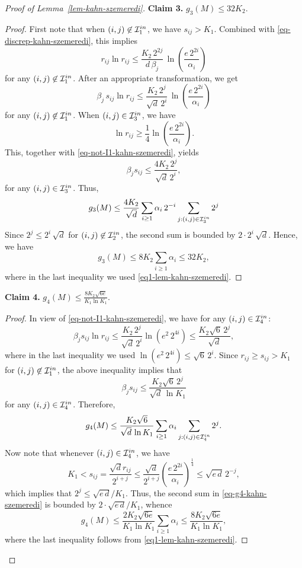 \documentclass[12pt]{article}
\theoremstyle{definition}
\theoremstyle{plain}
\def\InI{{\cal{I}}^{in}}
\begin{document}
\begin{proof}[Proof of Lemma~\ref{lem-kahn-szemeredi}]
\medskip

\noindent\textbf{Claim 3.} $g_3(M)\leq 32K_2$.
\begin{proof}
First note that when $(i,j)\not\in \InI_1$, we have $s_{ij}> K_1$.  Combined with \eqref{eq-discrep-kahn-szemeredi}, this implies 
$$
r_{ij}\ln r_{ij}\leq \frac{K_2\, 2^{2j}}{d\, \beta_j}\, \ln\left(\frac{e\, 2^{2i}}{\alpha_i}\right)
$$
for any  $(i,j)\not\in \InI_1$. After an appropriate transformation, we get
\begin{equation}\label{eq-not-I1-kahn-szemeredi}
\beta_j\, s_{ij}\ln r_{ij}\leq \frac{K_2\, 2^{j}}{\sqrt{d}\, 2^{i}}\, \ln\left(\frac{e\, 2^{2i}}{\alpha_i}\right)
\end{equation} 
for any  $(i,j)\not\in \InI_1$. When $(i,j)\in \InI_3$, we have
$$
\ln r_{ij}\geq \frac{1}{4}\ln\left(\frac{e\, 2^{2i}}{\alpha_i}\right).
$$
This, together with \eqref{eq-not-I1-kahn-szemeredi}, yields
$$
\beta_j s_{ij}\leq \frac{4K_2\, 2^{j}}{\sqrt{d}\, 2^i},
$$
for any  $(i,j)\in \InI_3$. 
Thus,
$$
g_3(M)\leq \frac{4K_2}{\sqrt{d}}\sum_{i\geq 1}\alpha_i\, 2^{-i} \sum_{j:(i,j)\in\InI_3} 2^j
$$
Since $2^{j}\leq 2^i\, \sqrt{d}$ for $(i,j)\not\in \InI_2$,
the second sum is bounded by $2\cdot 2^i\, \sqrt{d}$. Hence, we have
$$
g_3(M)\leq 8K_2\sum_{i\geq 1}\alpha_i\leq 32K_2,
$$
where in the last inequality we used \eqref{eq1-lem-kahn-szemeredi}.
\end{proof}


\medskip

\noindent\textbf{Claim 4.} $g_4(M)\leq \frac{8K_2\sqrt{6e}}{K_1 \ln K_1}$.
\begin{proof}
In view of \eqref{eq-not-I1-kahn-szemeredi}, we have for any $(i,j)\in \InI_4$: 
$$
\beta_j s_{ij}\ln r_{ij}\leq 
\frac{K_2\, 2^j}{\sqrt{d}\, 2^i}\ln( e^2\, 2^{4i})
\leq \frac{K_2\sqrt{6}\, 2^j}{\sqrt{d}},
$$
where in the last inequality we used $\ln( e^2\, 2^{4i})\leq \sqrt{6}\, 2^i$.
Since $r_{ij}\geq s_{ij}> K_1$ for $(i,j)\not\in \InI_1$, the above inequality implies that 
$$
\beta_j s_{ij}
\leq \frac{K_2\sqrt{6}\, 2^j}{\sqrt{d}\, \ln K_1}
$$
for any $(i,j)\in \InI_4$. Therefore,
\begin{equation}\label{eq-g4-kahn-szemeredi}
g_4(M)\leq  \frac{K_2\sqrt{6}}{\sqrt{d}\, \ln K_1}\sum_{i\geq 1}\alpha_i \sum_{j:(i,j)\in \InI_4} 2^j.
\end{equation}
Now note that whenever $(i,j)\in \InI_4$, we have
$$
K_1< s_{ij}= \frac{\sqrt{d} r_{ij}}{2^{i+j}}\leq \frac{\sqrt{d}}{2^{i+j}} \left(\frac{e\, 2^{2i}}{\alpha_i}\right)^{\frac14}\leq \sqrt{e\, d}\, 2^{-j},
$$
which implies that $2^{j}\leq \sqrt{e\, d}/K_1$. Thus, the second sum in \eqref{eq-g4-kahn-szemeredi} 
is bounded by $2\cdot \sqrt{e\, d}/K_1$, whence
$$
g_4(M)\leq \frac{2K_2\sqrt{6e}}{K_1 \ln K_1}\sum_{i\geq 1}\alpha_i \leq 
\frac{8K_2\sqrt{6e}}{K_1 \ln K_1},
$$
where the last inequality follows from \eqref{eq1-lem-kahn-szemeredi}.
\end{proof}



\end{proof}
\end{document}
